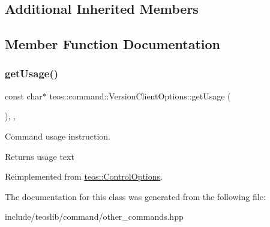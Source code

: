 \subsection*{Additional Inherited Members}


\subsection{Member Function Documentation}
\mbox{\label{classteos_1_1command_1_1_version_client_options_a28b69107e8eb50a2faf9594958bb1d6d}} 
\subsubsection{\texorpdfstring{get\+Usage()}{getUsage()}}
{\footnotesize\ttfamily const char$\ast$ teos\+::command\+::\+Version\+Client\+Options\+::get\+Usage (\begin{DoxyParamCaption}{ }\end{DoxyParamCaption})\hspace{0.3cm}{\ttfamily [inline]}, {\ttfamily [protected]}, {\ttfamily [virtual]}}



Command \textquotesingle{}usage\textquotesingle{} instruction. 

\begin{DoxyReturn}{Returns}
usage text 
\end{DoxyReturn}


Reimplemented from \mbox{\hyperlink{classteos_1_1_control_options_a0aa5671f9bc750ed5280c26c543874f3}{teos\+::\+Control\+Options}}.



The documentation for this class was generated from the following file\+:\begin{DoxyCompactItemize}
\item 
include/teoslib/command/other\+\_\+commands.\+hpp\end{DoxyCompactItemize}

